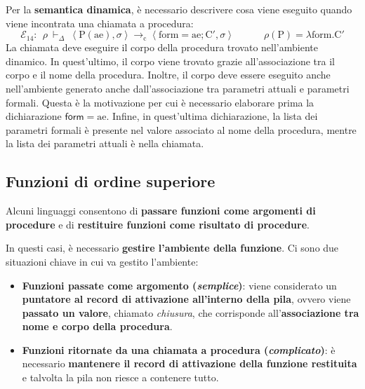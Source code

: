 \documentclass[a4paper]{article}
\begin{document}
	\noindent
	Per la \textbf{semantica dinamica}, è necessario descrivere cosa viene eseguito quando viene incontrata una chiamata a procedura:
	\begin{equation*}
		\mathcal{E}_{14}: \:\: \rho \: \vdash_{\Delta} \: \left\langle \mathrm{P}\left(\mathrm{ae}\right), \sigma \right\rangle \longrightarrow_{\mathrm{c}} \left\langle \mathrm{form} = \mathrm{ae}; \mathrm{C}', \sigma \right\rangle \hspace{3em} \rho\left(\mathrm{P}\right) = \lambda\mathrm{form}.\mathrm{C}'
	\end{equation*}
	La chiamata deve eseguire il corpo della procedura trovato nell'ambiente dinamico. In quest'ultimo, il corpo viene trovato grazie all'associazione tra il corpo e il nome della procedura. Inoltre, il corpo deve essere eseguito anche nell'ambiente generato anche dall'associazione tra parametri attuali e parametri formali. Questa è la motivazione per cui è necessario elaborare prima la dichiarazione $\textsf{form} = \mathrm{ae}$. Infine, in quest'ultima dichiarazione, la lista dei parametri formali è presente nel valore associato al nome della procedura, mentre la lista dei parametri attuali è nella chiamata.\newpage
	
	\subsection{Funzioni di ordine superiore}
	
	Alcuni linguaggi consentono di \textbf{passare funzioni come argomenti di procedure} e di \textbf{restituire funzioni come risultato di procedure}.\newline
	
	\noindent
	In questi casi, è necessario \textbf{gestire l'ambiente della funzione}. Ci sono due situazioni chiave in cui va gestito l'ambiente:
	\begin{itemize}
		\item \textbf{Funzioni passate come argomento (\emph{semplice})}: viene considerato un \textbf{puntatore al record di attivazione all'interno della pila}, ovvero viene \textbf{passato un valore}, chiamato \emph{chiusura}, che corrisponde all'\textbf{associazione tra nome e corpo della procedura}.
		
		\item \textbf{Funzioni ritornate da una chiamata a procedura (\emph{complicato})}: è necessario \textbf{mantenere il record di attivazione della funzione restituita} e talvolta la pila non riesce a contenere tutto.
	\end{itemize}
	
\end{document}
